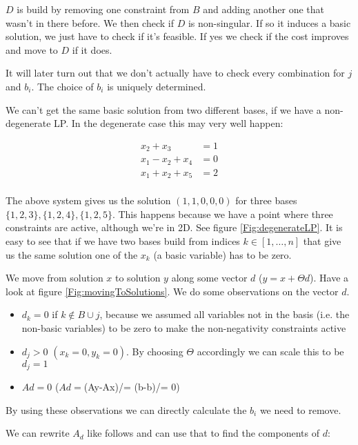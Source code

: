 $D$ is build by removing one constraint from $B$ and adding another one that wasn't in there before. We then check if $D$ is non-singular. If so it induces a basic solution, we just have to check if it's feasible. If yes we check if the cost improves and move to $D$ if it does.

It will later turn out that we don't actually have to check every combination for $j$ and $b_i$. The choice of $b_i$ is uniquely determined.

We can't get the same basic solution from two different bases, if we have a non-degenerate LP. In the degenerate case this may very well happen:

\begin{align*}
x_2 + x_3 &= 1\\
x_1 - x_2 +x_4 &=0\\
x_1 + x_2 +x_5 &= 2\\
\end{align*}


The above system gives us the solution $(1,1,0,0,0)$ for three bases $\{1,2,3\},\{1,2,4\},\{1,2,5\}$. This happens because we have a point where three constraints are active, although we're in 2D. See figure \ref{Fig:degenerateLP}. It is easy to see that if we have two bases build from indices $k\in [1,\ldots,n]$ that give us the same solution one of the $x_k$ (a basic variable) has to be zero. %


We move from solution $x$ to solution $y$ along some vector $d$ ($y=x+\Theta d$). Have a look at figure \ref{Fig:movingToSolutions}. We do some observations on the vector $d$. 

\begin{itemize}
\item $d_k=0$ if $k\not \in B \cup j$, because we assumed all variables not in the basis (i.e. the non-basic variables) to be zero to make the non-negativity constraints active 
\item $d_j>0$ $(x_k=0, y_k=0)$. By choosing $\Theta$ accordingly we can scale this to be $d_j=1$
\item $Ad = 0$ ($Ad = $(Ay-Ax)/\Theta = (b-b)/\Theta = 0)
\end{itemize}

By using these observations we can directly calculate the $b_i$ we need to remove.

We can rewrite $A_d$ like follows and can use that to find the components of $d$:

